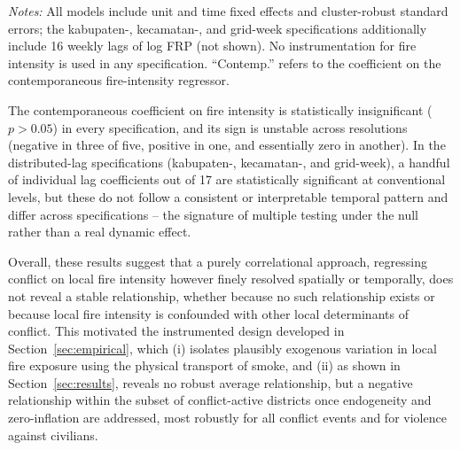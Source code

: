\documentclass[12pt]{article}
\begin{document}
\begin{table}[H]
\centering
\caption{Preliminary Poisson FE models, uninstrumented fire intensity}
\label{tab:prelim}
\begin{minipage}{0.95\textwidth}
\vspace{4pt}
\footnotesize \emph{Notes:} All models include unit and time fixed effects and cluster-robust standard errors; the kabupaten-, kecamatan-, and grid-week specifications additionally include 16 weekly lags of log FRP (not shown). No instrumentation for fire intensity is used in any specification. ``Contemp.'' refers to the coefficient on the contemporaneous fire-intensity regressor.
\end{minipage}
\end{table}

The contemporaneous coefficient on fire intensity is statistically insignificant ($p > 0.05$) in every specification, and its sign is unstable across resolutions (negative in three of five, positive in one, and essentially zero in another). In the distributed-lag specifications (kabupaten-, kecamatan-, and grid-week), a handful of individual lag coefficients out of 17 are statistically significant at conventional levels, but these do not follow a consistent or interpretable temporal pattern and differ across specifications -- the signature of multiple testing under the null rather than a real dynamic effect.

Overall, these results suggest that a purely correlational approach, regressing conflict on local fire intensity however finely resolved spatially or temporally, does not reveal a stable relationship, whether because no such relationship exists or because local fire intensity is confounded with other local determinants of conflict. This motivated the instrumented design developed in Section~\ref{sec:empirical}, which (i) isolates plausibly exogenous variation in local fire exposure using the physical transport of smoke, and (ii) as shown in Section~\ref{sec:results}, reveals no robust average relationship, but a negative relationship within the subset of conflict-active districts once endogeneity and zero-inflation are addressed, most robustly for all conflict events and for violence against civilians.
\end{document}
